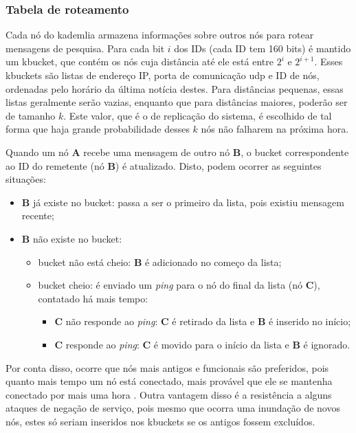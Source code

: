 
\subsubsection*{Tabela de roteamento}

Cada nó do \gls*{kademlia} armazena informações sobre outros nós para rotear mensagens
de pesquisa. Para cada bit $i$ dos IDs (cada ID tem 160 bits) é mantido um \gls{kbucket},
que contém os nós cuja distância até ele está entre $2^i$ e $2^{i+1}$. Esses
\glspl*{kbucket} são listas de endereço IP, porta de comunicação \gls*{udp} e ID de
nós, ordenadas pelo horário da última notícia destes. Para distâncias pequenas, essas
listas geralmente serão vazias, enquanto que para distâncias maiores, poderão ser de
tamanho $k$. Este valor, que é o de replicação do sistema, é escolhido de tal forma que
haja grande probabilidade desses $k$ nós não falharem na próxima hora.

Quando um nó \textbf{A} recebe uma mensagem de outro nó \textbf{B}, o \gls*{bucket}
correspondente ao ID do remetente (nó \textbf{B}) é atualizado. Disto, podem ocorrer as
seguintes situações:

\begin{itemize}
    \item \textbf{B} já existe no \gls*{bucket}: passa a ser o primeiro da lista, pois
        existiu mensagem recente;

    \item \textbf{B} não existe no \gls*{bucket}:
        \begin{itemize}
            \item \gls*{bucket} não está cheio: \textbf{B} é adicionado no começo da
                lista;
            \item \gls*{bucket} cheio: é enviado um \emph{ping} para o nó do final da
                lista (nó \textbf{C}), contatado há mais tempo:

                \begin{itemize}
                    \item \textbf{C} não responde ao \emph{ping}: \textbf{C} é retirado
                        da lista e \textbf{B} é inserido no início;
                    \item \textbf{C} responde ao \emph{ping}: \textbf{C} é movido para o
                        início da lista e \textbf{B} é ignorado.
                \end{itemize}
        \end{itemize}
\end{itemize}

Por conta disso, ocorre que nós mais antigos e funcionais são preferidos, pois quanto
mais tempo um nó está conectado, mais provável que ele se mantenha conectado por mais
uma hora \cite{artigo:gnutella-uptime}. Outra vantagem disso é a resistência a alguns
ataques de negação de serviço, pois mesmo que ocorra uma inundação de novos nós, estes
só seriam inseridos nos \glspl*{kbucket} se os antigos fossem excluídos.